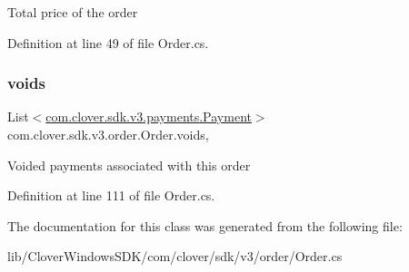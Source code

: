 Total price of the order 



Definition at line 49 of file Order.\+cs.

\mbox{\label{classcom_1_1clover_1_1sdk_1_1v3_1_1order_1_1_order_afa873072e171007d2a63a9c84be27c25}} 
\subsubsection{\texorpdfstring{voids}{voids}}
{\footnotesize\ttfamily List$<$\hyperlink{classcom_1_1clover_1_1sdk_1_1v3_1_1payments_1_1_payment}{com.\+clover.\+sdk.\+v3.\+payments.\+Payment}$>$ com.\+clover.\+sdk.\+v3.\+order.\+Order.\+voids\hspace{0.3cm}{\ttfamily [get]}, {\ttfamily [set]}}



Voided payments associated with this order 



Definition at line 111 of file Order.\+cs.



The documentation for this class was generated from the following file\+:\begin{DoxyCompactItemize}
\item 
lib/\+Clover\+Windows\+S\+D\+K/com/clover/sdk/v3/order/Order.\+cs\end{DoxyCompactItemize}

